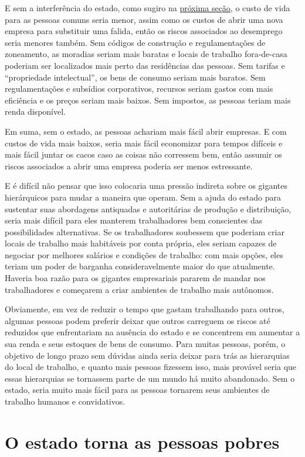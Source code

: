 E sem a interferência do estado, como sugiro na \hyperref[sec:1]{próxima seção}, o custo de vida para as pessoas comuns seria menor, assim como os custos de abrir uma nova empresa para substituir uma falida, então os riscos associados ao desemprego seria menores também. Sem códigos de construção e regulamentações de zoneamento, as moradias seriam mais baratas e locais de trabalho fora-de-casa poderiam ser localizados mais perto das residências das pessoas. Sem tarifas e ``propriedade intelectual'', os bens de consumo seriam mais baratos. Sem regulamentações e subsídios corporativos, recursos seriam gastos com mais eficiência e os preços seriam mais baixos. Sem impostos, as pessoas teriam mais renda disponível.

Em suma, sem o estado, as pessoas achariam mais fácil abrir empresas. E com custos de vida mais baixos, seria mais fácil economizar para tempos difíceis e mais fácil juntar os cacos caso as coisas não corressem bem, então assumir os riscos associados a abrir uma empresa poderia ser menos estressante. 

E é difícil não pensar que isso colocaria uma pressão indireta sobre os gigantes hierárquicos para mudar a maneira que operam. Sem a ajuda do estado para sustentar suas abordagens antiquadas e autoritárias de produção e distribuição, seria mais difícil para eles manterem trabalhadores bem conscientes das possibilidades alternativas. Se os trabalhadores soubessem que poderiam criar locais de trabalho mais habitáveis por conta própria, eles seriam capazes de negociar por melhores salários e condições de trabalho: com mais opções, eles teriam um poder de barganha consideravelmente maior do que atualmente. Haveria boa razão para os gigantes empresariais pararem de mandar nos trabalhadores e começarem a criar ambientes de trabalho mais autônomos.

Obviamente, em vez de reduzir o tempo que gastam trabalhando para outros, algumas pessoas podem preferir deixar que outros carreguem os riscos até reduzidos que enfrentariam na ausência do estado e se concentrem em aumentar a sua renda e seus estoques de bens de consumo. Para muitas pessoas, porém, o objetivo de longo prazo sem dúvidas ainda seria deixar para trás as hierarquias do local de trabalho, e quanto mais pessoas fizessem isso, mais provável seria que essas hierarquias se tornassem parte de um mundo há muito abandonado. Sem o estado, seria muito mais fácil para as pessoas tornarem seus ambientes de trabalho humanos e convidativos.

\section{O estado torna as pessoas pobres}
\label{sec:1}

